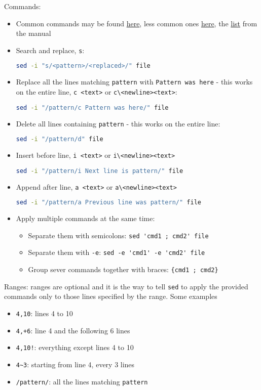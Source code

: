 \documentclass[a4paper,12pt,%
              final%
              ]{article}
\begin{document}
Commands:
\begin{itemize}
  \item Common commands may be found \href{https://www.gnu.org/software/sed/manual/sed.html#Common-Commands}{here}, less common ones \href{https://www.gnu.org/software/sed/manual/sed.html#Other-Commands}{here}, the \href{https://www.gnu.org/software/sed/manual/html_node/sed-commands-list.html}{list} from the manual
  \item Search and replace, \verb|s|:
\begin{lstlisting}[language=bash]
sed -i "s/<pattern>/<replaced>/" file
\end{lstlisting}
  \item Replace all the lines matching \verb|pattern| with \verb|Pattern was here| - this works on the entire line, \verb|c <text>| or \verb|c\<newline><text>|:
\begin{lstlisting}[language=bash]
sed -i "/pattern/c Pattern was here/" file
\end{lstlisting}
  \item Delete all lines containing \verb|pattern| - this works on the entire line:
\begin{lstlisting}[language=bash]
sed -i "/pattern/d" file
\end{lstlisting}
  \item Insert before line, \verb|i <text>| or \verb|i\<newline><text>|
\begin{lstlisting}[language=bash]
sed -i "/pattern/i Next line is pattern/" file
\end{lstlisting}
  \item Append after line, \verb|a <text>| or \verb|a\<newline><text>|
\begin{lstlisting}[language=bash]
sed -i "/pattern/a Previous line was pattern/" file
\end{lstlisting}
  \item Apply multiple commands at the same time:
    \begin{itemize}
      \item Separate them with semicolons: \verb|sed 'cmd1 ; cmd2' file|
      \item Separate them with \verb|-e|: \verb|sed -e 'cmd1' -e 'cmd2' file|
      \item Group sever commands together with braces: \verb|{cmd1 ; cmd2}|
    \end{itemize}
\end{itemize}

Ranges: ranges are optional and it is the way to tell \verb|sed| to apply the provided commands only to those lines specified by the range. Some examples
\begin{itemize}
  \item \verb|4,10|: lines 4 to 10
  \item \verb|4,+6|: line 4 and the following 6 lines
  \item \verb|4,10!|: everything except lines 4 to 10
  \item \verb|4~3|: starting from line 4, every 3 lines
  \item \verb|/pattern/|: all the lines matching \verb|pattern|
\end{itemize}
\end{document}
